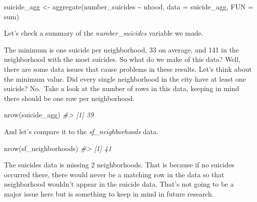 \documentclass[
  12pt,
  openany]{book}
\newenvironment{Shaded}{\begin{snugshade}}{\end{snugshade}}
\newcommand{\AttributeTok}[1]{\textcolor[rgb]{0.61,0.61,0.61}{#1}}
\newcommand{\CommentTok}[1]{\textcolor[rgb]{0.37,0.37,0.37}{\textit{#1}}}
\newcommand{\FunctionTok}[1]{\textcolor[rgb]{0,0,0}{#1}}
\newcommand{\NormalTok}[1]{#1}
\newcommand{\OtherTok}[1]{\textcolor[rgb]{0.37,0.37,0.37}{#1}}
\newcommand{\SpecialCharTok}[1]{\textcolor[rgb]{0,0,0}{#1}}
\begin{document}
\begin{Shaded}
\begin{Highlighting}[]
\NormalTok{suicide\_agg }\OtherTok{\textless{}{-}} \FunctionTok{aggregate}\NormalTok{(number\_suicides }\SpecialCharTok{\textasciitilde{}}\NormalTok{ nhood, }\AttributeTok{data =}\NormalTok{ suicide\_agg, }\AttributeTok{FUN =}\NormalTok{ sum)}
\end{Highlighting}
\end{Shaded}

Let's check a summary of the \emph{number\_suicides} variable we made.

\begin{Shaded}
\end{Shaded}

The minimum is one suicide per neighborhood, 33 on average, and 141 in the neighborhood with the most suicides. So what do we make of this data? Well, there are some data issues that cause problems in these results. Let's think about the minimum value. Did every single neighborhood in the city have at least one suicide? No.~Take a look at the number of rows in this data, keeping in mind there should be one row per neighborhood.

\begin{Shaded}
\begin{Highlighting}[]
\FunctionTok{nrow}\NormalTok{(suicide\_agg)}
\CommentTok{\#\textgreater{} [1] 39}
\end{Highlighting}
\end{Shaded}

And let's compare it to the \emph{sf\_neighborhoods} data.

\begin{Shaded}
\begin{Highlighting}[]
\FunctionTok{nrow}\NormalTok{(sf\_neighborhoods)}
\CommentTok{\#\textgreater{} [1] 41}
\end{Highlighting}
\end{Shaded}

The suicides data is missing 2 neighborhoods. That is because if no suicides occurred there, there would never be a matching row in the data so that neighborhood wouldn't appear in the suicide data. That's not going to be a major issue here but is something to keep in mind in future research.
\end{document}
